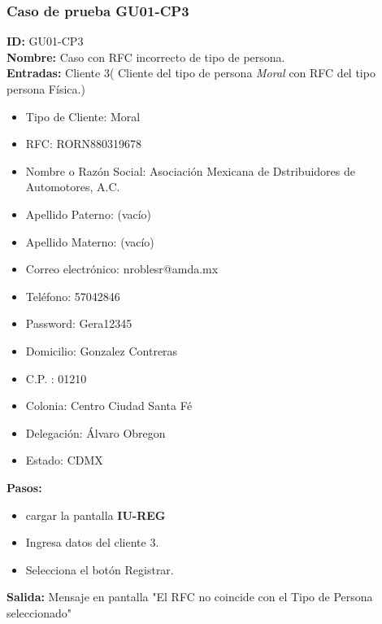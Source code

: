 \subsubsection{Caso de prueba GU01-CP3}
\textbf{ID:} GU01-CP3\\
\textbf{Nombre:} Caso con RFC incorrecto de tipo de persona.\\
\textbf{Entradas:} 
Cliente 3( Cliente del tipo de persona \textit{Moral} con RFC del tipo persona Física.)
\begin{itemize}
    \item Tipo de Cliente: Moral
    \item RFC: RORN880319678
    \item Nombre o Razón Social: Asociación Mexicana de Dstribuidores de Automotores, A.C.
    \item Apellido Paterno: (vacío)
    \item Apellido Materno: (vacío)
    \item Correo electrónico: nroblesr@amda.mx
    \item Teléfono: 57042846
    \item Password: Gera12345
    \item Domicilio: Gonzalez Contreras
    \item C.P. : 01210
    \item Colonia: Centro Ciudad Santa Fé
    \item Delegación: Álvaro Obregon
    \item Estado: CDMX\\
\end{itemize}
\textbf{Pasos:}
\begin{itemize}
\item cargar la pantalla \textbf{IU-REG}
    \item Ingresa datos del cliente 3.
    \item Selecciona el botón Registrar.
\end{itemize}
\textbf{Salida:}
Mensaje en pantalla "El RFC no coincide con el Tipo de Persona seleccionado"
\clearpage

